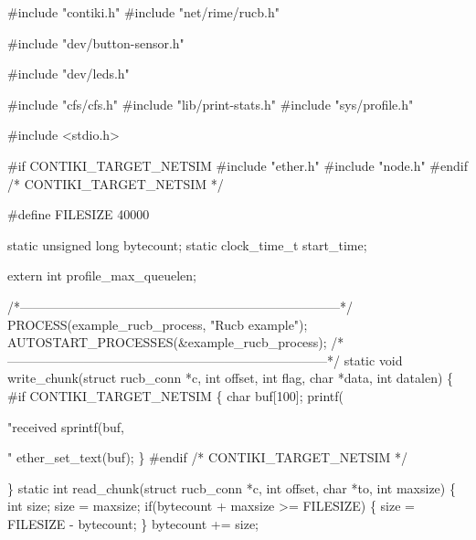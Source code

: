 \begin{DoxyCodeInclude}
\textcolor{preprocessor}{#include "contiki.h"}
\textcolor{preprocessor}{#include "net/rime/rucb.h"}

\textcolor{preprocessor}{#include "dev/button-sensor.h"}

\textcolor{preprocessor}{#include "dev/leds.h"}

\textcolor{preprocessor}{#include "cfs/cfs.h"}
\textcolor{preprocessor}{#include "lib/print-stats.h"}
\textcolor{preprocessor}{#include "sys/profile.h"}

\textcolor{preprocessor}{#include <stdio.h>}

\textcolor{preprocessor}{#if CONTIKI\_TARGET\_NETSIM}
\textcolor{preprocessor}{#include "ether.h"}
\textcolor{preprocessor}{#include "node.h"}
\textcolor{preprocessor}{#endif }\textcolor{comment}{/* CONTIKI\_TARGET\_NETSIM */}\textcolor{preprocessor}{}

\textcolor{preprocessor}{#define FILESIZE 40000}

\textcolor{keyword}{static} \textcolor{keywordtype}{unsigned} \textcolor{keywordtype}{long} bytecount;
\textcolor{keyword}{static} clock\_time\_t start\_time;

\textcolor{keyword}{extern} \textcolor{keywordtype}{int} profile\_max\_queuelen;

\textcolor{comment}{/*---------------------------------------------------------------------------*/}
PROCESS(example\_rucb\_process, \textcolor{stringliteral}{"Rucb example"});
AUTOSTART\_PROCESSES(&example\_rucb\_process);
\textcolor{comment}{/*---------------------------------------------------------------------------*/}
\textcolor{keyword}{static} \textcolor{keywordtype}{void}
write\_chunk(\textcolor{keyword}{struct} rucb\_conn *c, \textcolor{keywordtype}{int} offset, \textcolor{keywordtype}{int} flag,
            \textcolor{keywordtype}{char} *data, \textcolor{keywordtype}{int} datalen)
\{
\textcolor{preprocessor}{#if CONTIKI\_TARGET\_NETSIM}
  \{
    \textcolor{keywordtype}{char} buf[100];
    printf(\textcolor{stringliteral}{"received %
    sprintf(buf, \textcolor{stringliteral}{"%
    ether\_set\_text(buf);
  \}
\textcolor{preprocessor}{#endif }\textcolor{comment}{/* CONTIKI\_TARGET\_NETSIM */}\textcolor{preprocessor}{}

\}
\textcolor{keyword}{static} \textcolor{keywordtype}{int}
read\_chunk(\textcolor{keyword}{struct} rucb\_conn *c, \textcolor{keywordtype}{int} offset, \textcolor{keywordtype}{char} *to, \textcolor{keywordtype}{int} maxsize)
\{
  \textcolor{keywordtype}{int} size;
  size = maxsize;
  \textcolor{keywordflow}{if}(bytecount + maxsize >= FILESIZE) \{
    size = FILESIZE - bytecount;
  \}
  bytecount += size;

}}
\end{DoxyCodeInclude}

